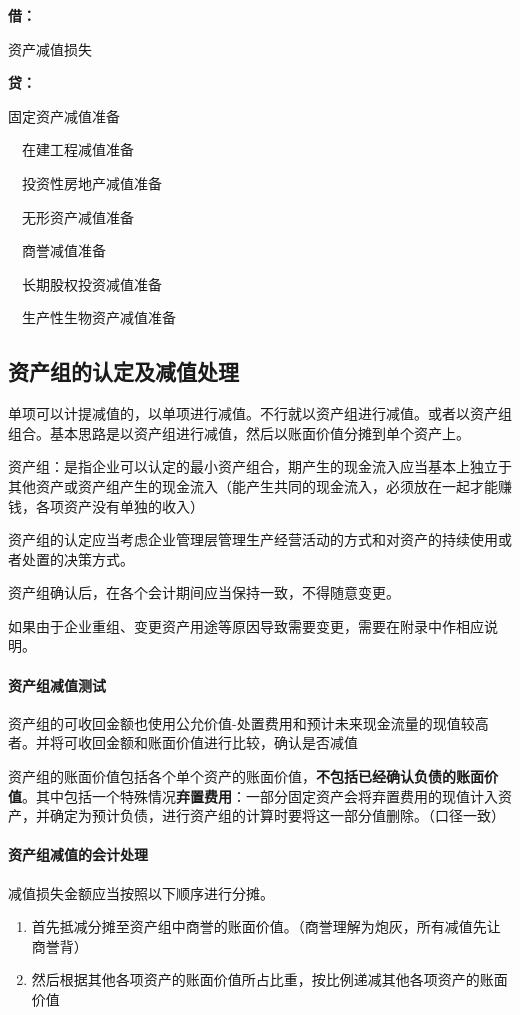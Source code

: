 \documentclass[UTF8,12pt]{ctexart}
\newenvironment{Dr}{%
	\begin{list}{}%
		{
			\setlength{\leftmargin}{2em}
			\setlength{\labelwidth}{2em}
			\setlength{\labelsep}{0pt}
			\setlength{\itemindent}{0pt}
			\setlength{\listparindent}{0pt}
			\setlength{\parsep}{0pt}
			\setlength{\topsep}{0pt}
		}
		\item[\textbf{借：}]
	}{%
	\end{list}
}
\newenvironment{Cr}{%
	\begin{list}{}%
		{
			\setlength{\leftmargin}{2em}
			\setlength{\labelwidth}{2em}
			\setlength{\labelsep}{0pt}
			\setlength{\itemindent}{0pt}
			\setlength{\listparindent}{0pt}
			\setlength{\parsep}{0pt}
			\setlength{\topsep}{0pt}
		}
		\item[\textbf{贷：}]
	}{%
	\end{list}
}
\numberwithin{equation}{section} %
\numberwithin{figure}{section}
\numberwithin{table}{section}
\begin{document}
	\begin{Dr}
		资产减值损失
	\end{Dr}
	\begin{Cr}
		固定资产减值准备
		
		\ \ 在建工程减值准备
		
		\ \ 投资性房地产减值准备
		
		\ \ 无形资产减值准备
		
		\ \ 商誉减值准备
		
		\ \ 长期股权投资减值准备
		
		\ \ 生产性生物资产减值准备
	\end{Cr}
	
	
	\subsection{资产组的认定及减值处理}
	单项可以计提减值的，以单项进行减值。不行就以资产组进行减值。或者以资产组组合。基本思路是以资产组进行减值，然后以账面价值分摊到单个资产上。
	
	资产组：是指企业可以认定的最小资产组合，期产生的现金流入应当基本上独立于其他资产或资产组产生的现金流入（能产生共同的现金流入，必须放在一起才能赚钱，各项资产没有单独的收入）
	
	资产组的认定应当考虑企业管理层管理生产经营活动的方式和对资产的持续使用或者处置的决策方式。
	
	资产组确认后，在各个会计期间应当保持一致，不得随意变更。
	
	如果由于企业重组、变更资产用途等原因导致需要变更，需要在附录中作相应说明。
	
	\paragraph{资产组减值测试} 资产组的可收回金额也使用公允价值-处置费用和预计未来现金流量的现值较高者。并将可收回金额和账面价值进行比较，确认是否减值
	
	资产组的账面价值包括各个单个资产的账面价值，\textbf{不包括已经确认负债的账面价值}。其中包括一个特殊情况\textbf{弃置费用}：一部分固定资产会将弃置费用的现值计入资产，并确定为预计负债，进行资产组的计算时要将这一部分值删除。（口径一致）
	
	\paragraph{资产组减值的会计处理}
	减值损失金额应当按照以下顺序进行分摊。
	\begin{enumerate}
		\item 首先抵减分摊至资产组中商誉的账面价值。（商誉理解为炮灰，所有减值先让商誉背）
		
		\item 然后根据其他各项资产的账面价值所占比重，按比例递减其他各项资产的账面价值
	\end{enumerate}
	
\end{document}
